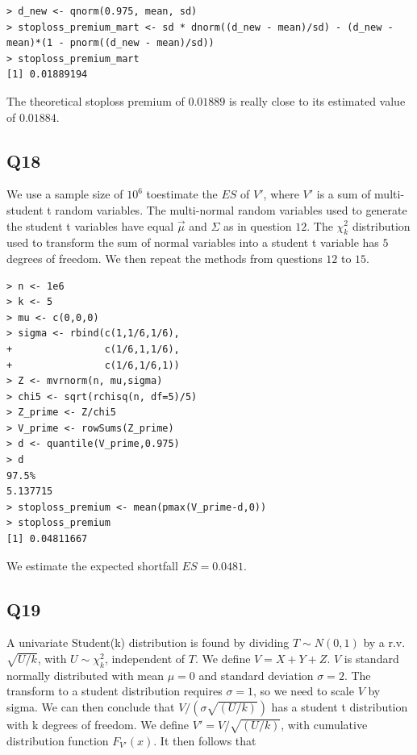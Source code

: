 \begin{verbatim}
> d_new <- qnorm(0.975, mean, sd)
> stoploss_premium_mart <- sd * dnorm((d_new - mean)/sd) - (d_new - mean)*(1 - pnorm((d_new - mean)/sd))
> stoploss_premium_mart
[1] 0.01889194
\end{verbatim}

The theoretical stoploss premium of $0.01889$ is really close to its estimated value of $0.01884$.

\subsection*{Q18}

We use a sample size of $10^6$ toestimate the $ES$ of $V'$, where $V'$ is a sum of multi-student t random variables. The multi-normal random variables used to generate the student t variables have equal $\vec{\mu}$ and $\Sigma$ as in question $12$. The $\chi^2_k$ distribution used to transform the sum of normal variables into a student t variable has $5$ degrees of freedom. We then repeat the methods from questions $12$ to $15$.

\begin{verbatim}
> n <- 1e6
> k <- 5
> mu <- c(0,0,0)
> sigma <- rbind(c(1,1/6,1/6),
+                c(1/6,1,1/6),
+                c(1/6,1/6,1))
> Z <- mvrnorm(n, mu,sigma)
> chi5 <- sqrt(rchisq(n, df=5)/5)
> Z_prime <- Z/chi5
> V_prime <- rowSums(Z_prime)
> d <- quantile(V_prime,0.975)
> d
97.5% 
5.137715 
> stoploss_premium <- mean(pmax(V_prime-d,0)) 
> stoploss_premium
[1] 0.04811667
\end{verbatim}

We estimate the expected shortfall $ES = 0.0481$.

\subsection*{Q19}

A univariate Student(k) distribution is found by dividing $T \sim N(0,1)$ by a r.v. $\sqrt{U/k}$, with $U \sim \chi^2_k$, independent of $T$. We define $V = X + Y + Z$. $V$ is standard normally distributed with mean $\mu = 0$ and standard deviation $\sigma = 2$. The transform to a student distribution requires $\sigma = 1$, so we need to scale $V$ by sigma. We can then conclude that  $V/(\sigma \sqrt{(U/k)})$ has a student t distribution with k degrees of freedom. We define $V' = V/\sqrt{(U/k)}$, with cumulative distribution function $F_{V'}(x)$. It then follows that

